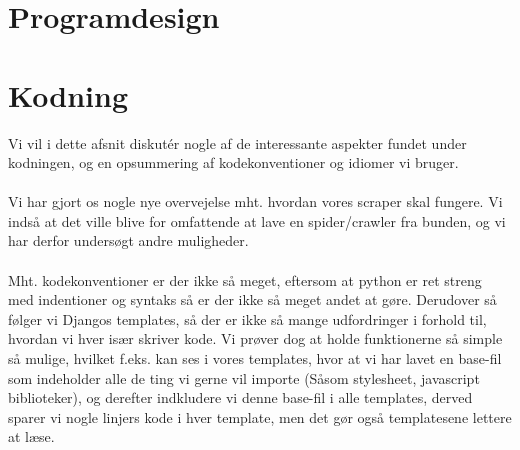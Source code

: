 \documentclass[11pt]{article}
\begin{document}
\section{Programdesign}

\section{Kodning}
Vi vil i dette afsnit diskutér nogle af de interessante aspekter fundet under kodningen, og en opsummering af kodekonventioner og idiomer vi bruger. \\ \\
Vi har gjort os nogle nye overvejelse mht. hvordan vores scraper skal fungere. Vi indså at det ville blive for omfattende at lave en spider/crawler fra bunden, og vi har derfor undersøgt andre muligheder. \\ \\
Mht. kodekonventioner er der ikke så meget, eftersom at python er ret streng med indentioner og syntaks så er der ikke så meget andet at gøre. Derudover så følger vi Djangos templates, så der er ikke så mange udfordringer i forhold til, hvordan vi hver især skriver kode. Vi prøver dog at holde funktionerne så simple så mulige, hvilket f.eks. kan ses i vores templates, hvor at vi har lavet en base-fil som indeholder alle de ting vi gerne vil importe (Såsom stylesheet, javascript biblioteker), og derefter indkludere vi denne base-fil i alle templates, derved sparer vi nogle linjers kode i hver template, men det gør også templatesene lettere at læse.
\end{document}
